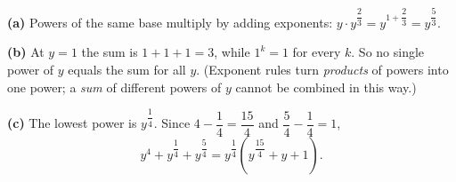 \textbf{(a)} Powers of the same base multiply by adding exponents: $y\cdot y^{\dfrac23}=y^{1+\dfrac23}=\boxed{y^{\dfrac53}}$.

\textbf{(b)} At $y=1$ the sum is $1+1+1=3$, while $1^k=1$ for every $k$. So no single power of $y$ equals the sum for all $y$. (Exponent rules turn \emph{products} of powers into one power; a \emph{sum} of different powers of $y$ cannot be combined in this way.)

\textbf{(c)} The lowest power is $y^{\dfrac14}$. Since $4-\dfrac14=\dfrac{15}{4}$ and $\dfrac54-\dfrac14=1$,
\[y^4+y^{\dfrac14}+y^{\dfrac54}=\boxed{y^{\dfrac14}\left(y^{\dfrac{15}{4}}+y+1\right)}.\]
